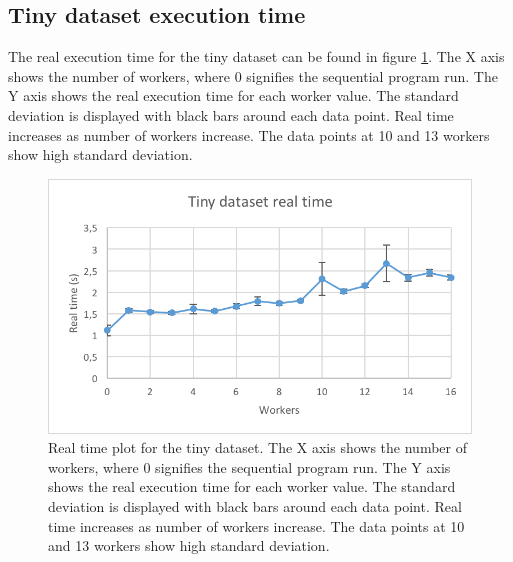 \subsection{Tiny dataset execution time}
The real execution time for the tiny dataset can be found in figure \ref{fig:dataset_1_real_time}.
The X axis shows the number of workers, where 0 signifies the sequential program run.
The Y axis shows the real execution time for each worker value. The standard deviation is displayed with black bars around each data point. Real time
increases as number of workers increase. The data points at 10 and 13 workers show high standard deviation.
\begin{figure}[ht]
  \centering
  \includegraphics[width=120mm]{figures/dataset_1/dataset_1_real_time.png}
  \caption[Real time plot for the tiny dataset.]{Real time plot for the tiny dataset. The X axis shows the number of workers, where 0 signifies the sequential program run.
  The Y axis shows the real execution time for each worker value. The standard deviation is displayed with black bars around each data point. Real time
  increases as number of workers increase. The data points at 10 and 13 workers show high standard deviation.}
  \label{fig:dataset_1_real_time}
\end{figure}

